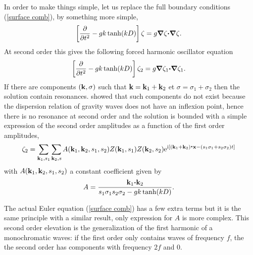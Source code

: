 In order to make things simple, let us replace the full boundary conditions  (\ref{surface comb}),  by something more simple, 
\begin{equation}
\left[ \frac{\partial }{\partial t^2} - g k \tanh(kD) \right]\zeta  = g \mbox{\boldmath $\nabla$} \zeta \mbox{\boldmath $\cdot$} \mbox{\boldmath $\nabla$} \zeta.
\end{equation}
At second order this gives the following forced harmonic oscillator equation 
\begin{equation}
\left[ \frac{\partial }{\partial t^2} - g k \tanh(kD) \right]\zeta_2  = g \mbox{\boldmath $\nabla$} \zeta_1 \mbox{\boldmath $\cdot$} \mbox{\boldmath $\nabla$} \zeta_1.
\end{equation}
If there are components $(\mathbf{k},\sigma)$ such that $\mathbf{k}=\mathbf{k}_1+\mathbf{k}_2$ et $\sigma=\sigma_1+\sigma_2$ then the solution contain resonances. \cite{Phillips1960} showed
that such components do not exist because the dispersion relation of gravity waves does not have an inflexion point, hence there is no resonance at second order 
and the solution is bounded with a simple expression of the second order amplitudes as a function of the first order amplitudes, 
\begin{equation}
 \zeta_2=\sum_{\mathbf{k}_1,s_1} \sum_{\mathbf{k}_2,s} A (\mathbf{k}_1,\mathbf{k}_2,s_1,s_2) Z(\mathbf{k}_1,s_1)  Z(\mathbf{k}_2,s_2)  
\mathrm{e}^{\mathrm{i} \left[(\mathbf{k}_1 + \mathbf{k}_2) \mbox{\boldmath $\cdot$} \mathbf{x} -(s_1 \sigma_1+s_2 \sigma_2) t\right]} \label{zeta2}
\end{equation}
with $A (\mathbf{k}_1,\mathbf{k}_2,s_1,s_2)$ a constant coefficient given by
\begin{equation}
 A=\frac{\mathbf{k}_1 \mbox{\boldmath $\cdot$} \mathbf{k}_2 }{s_1 \sigma_1 s_2 \sigma_2 - g k \tanh(kD)}\label{eq:nl_A_simple}.
\end{equation}

The actual Euler equation  (\ref{surface comb}) has a few extra terms but it is the same principle with a similar result, only expression for  $A$ is more complex. 
This second order elevation is the generalization of the first harmonic of a monochromatic waves: if the first order only contains waves of frequency $f$, 
the the second order has components with frequency $2f$ and 0. 

